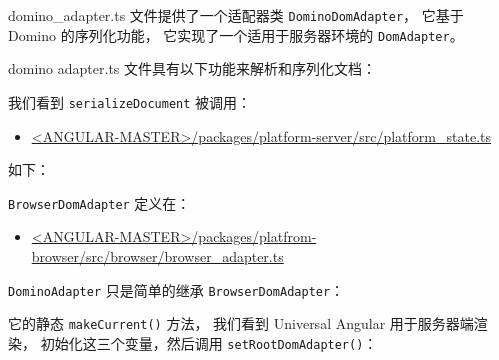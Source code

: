 domino\_adapter.ts 文件提供了一个适配器类 \texttt{DominoDomAdapter}，
它基于 Domino 的序列化功能，
它实现了一个适用于服务器环境的 \texttt{DomAdapter}。


domino adapter.ts 文件具有以下功能来解析和序列化文档：




我们看到 \texttt{serializeDocument} 被调用：

\begin{itemize}
  \item \href{https://github.com/angular/angular/blob/master/packages/platform-server/src/platform_state.ts}
        {<ANGULAR-MASTER>/packages/platform-server/src/platform\_state.ts}
\end{itemize}


如下：




\texttt{BrowserDomAdapter} 定义在：

\begin{itemize}
  \item \href{https://github.com/angular/angular/blob/master/packages/platform-browser/src/browser/browser_adapter.ts}
        {<ANGULAR-MASTER>/packages/platfrom-browser/src/browser/browser\_adapter.ts}
\end{itemize}


\texttt{DominoAdapter} 只是简单的继承 \texttt{BrowserDomAdapter}：




它的静态 \texttt{makeCurrent()} 方法，
我们看到 Universal Angular 用于服务器端渲染，
初始化这三个变量，然后调用 \texttt{setRootDomAdapter()}：



